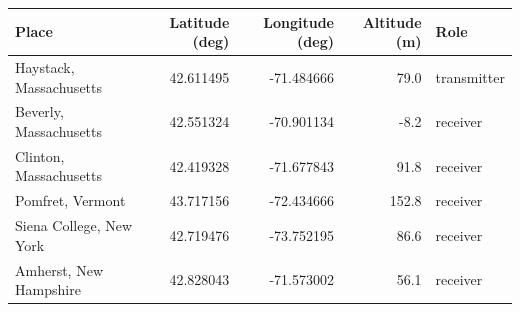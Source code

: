 \begin{tabular}{lrrrl}
\toprule
Place & Latitude (deg) & Longitude (deg) & Altitude (m) & Role \\
\midrule
Haystack, Massachusetts & 42.611495 & -71.484666 & 79.0 & transmitter \\
Beverly, Massachusetts & 42.551324 & -70.901134 & -8.2 & receiver \\
Clinton, Massachusetts & 42.419328 & -71.677843 & 91.8 & receiver \\
Pomfret, Vermont & 43.717156 & -72.434666 & 152.8 & receiver \\
Siena College, New York & 42.719476 & -73.752195 & 86.6 & receiver \\
Amherst, New Hampshire & 42.828043 & -71.573002 & 56.1 & receiver \\
\bottomrule
\end{tabular}
